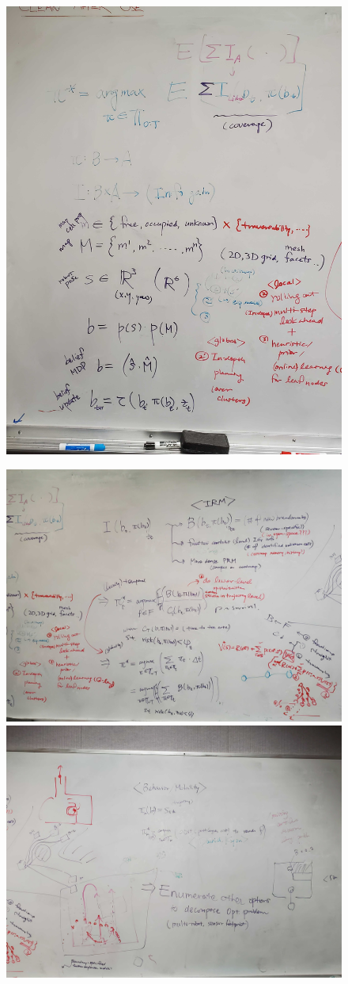 \documentclass[letterpaper, 10 pt, conference]{ieeeconf}  %
\begin{document}
\clearpage
\begin{figure}[H]
  \centering
  \includegraphics[width=.9\textwidth]{figures/whiteboardI.jpg}
\end{figure}
\clearpage
\begin{figure}[H]
  \centering
  \includegraphics[width=.9\textwidth]{figures/whiteboardII.jpg}
  \includegraphics[width=.9\textwidth]{figures/whiteboardIII.jpg}
\end{figure}
\clearpage
\end{document}
